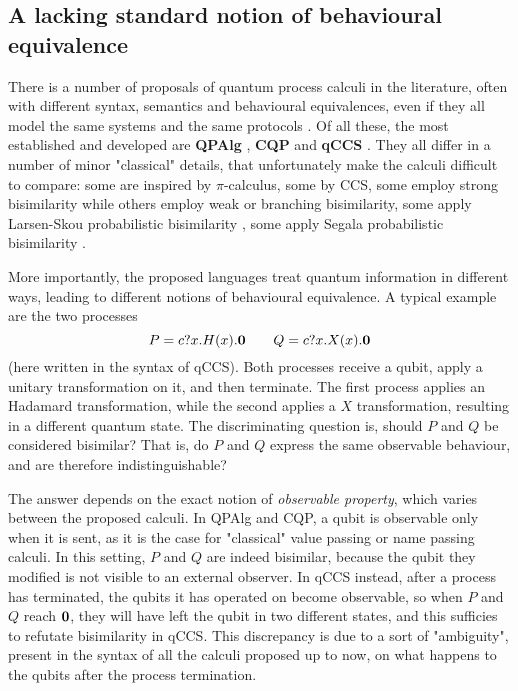 \subsection*{A lacking standard notion of behavioural equivalence}

There is a number of proposals of quantum process calculi in the literature, often with different syntax, semantics and behavioural equivalences, even if they all model the same systems and the same protocols \cite{lalireProcessAlgebraicApproach2004, gayCommunicatingQuantumProcesses2005, fengProbabilisticBisimulationsQuantum2007, yingAlgebraQuantumProcesses2010, wangProbabilisticProcessAlgebra2019}. Of all these, the most established and developed are \textbf{QPAlg} \cite{lalireProcessAlgebraicApproach2004}, \textbf{CQP} \cite{gayCommunicatingQuantumProcesses2005} and \textbf{qCCS} \cite{fengProbabilisticBisimulationsQuantum2007}. They all differ in  a number of minor "classical" details, that unfortunately make the calculi difficult to compare: some are inspired by $\pi$-calculus, some by CCS, some employ strong bisimilarity while others employ weak or branching bisimilarity, some apply Larsen-Skou probabilistic bisimilarity \cite{larsenBisimulationProbabilisticTesting1991}, some apply Segala probabilistic bisimilarity \cite{segalaProbabilisticSimulationsProbabilistic1994}.

More importantly, the proposed languages treat quantum information in different ways, leading to different notions of behavioural equivalence. 
A typical example are the two processes 
\[P = c?x.H(x).\mathbf{0} \qquad Q = c?x.X(x).\mathbf{0}\]
(here written in the syntax of qCCS). Both processes receive a qubit, apply a unitary transformation on it, and then terminate. The first process applies an Hadamard transformation, while the second applies a $X$ transformation, resulting in a different quantum state. The discriminating question is, should $P$ and $Q$ be considered bisimilar? That is, do $P$ and $Q$ express the same observable behaviour, and are therefore indistinguishable? 

The answer depends on the exact notion of \textit{observable property}, which varies between the proposed calculi. In QPAlg and CQP, a qubit is observable only when it is sent, as it is the case for "classical" value passing or name passing calculi. In this setting, $P$ and $Q$ are indeed bisimilar, because the qubit they modified is not visible to an external observer. In qCCS instead, after a process has terminated, the qubits it has operated on become observable, so when $P$ and $Q$ reach $\mathbf{0}$, they will have left the qubit in two different states, and this sufficies to refutate bisimilarity in qCCS. This discrepancy is due to a sort of "ambiguity", present in the syntax of all the calculi proposed up to now, on what happens to the qubits after the process termination.
 
